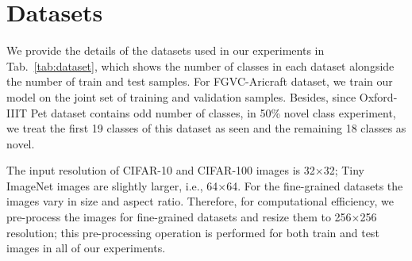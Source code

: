 \documentclass[runningheads]{eccv2022submission}
\begin{document}
\section{Datasets}
\label{sec:dataset}
We provide the details of the datasets used in our experiments in Tab.~\ref{tab:dataset}, which shows the number of classes in each dataset alongside the number of train and test samples. For FGVC-Aricraft\cite{maji13fine-grained} dataset, we train our model on the joint set of training and validation samples. Besides, since Oxford-IIIT Pet dataset contains odd number of classes, in 50\% novel class experiment, we treat the first 19 classes of this dataset as seen and the remaining 18 classes as novel.   


The input resolution of CIFAR-10 and CIFAR-100 images is 32$\times$32; Tiny ImageNet images are slightly larger, i.e., 64$\times$64. For the fine-grained datasets the images vary in size and aspect ratio. Therefore, for computational efficiency, we pre-process the images for fine-grained datasets and resize them to 256$\times$256 resolution; this pre-processing operation is performed for both train and test images in all of our experiments.
\end{document}
